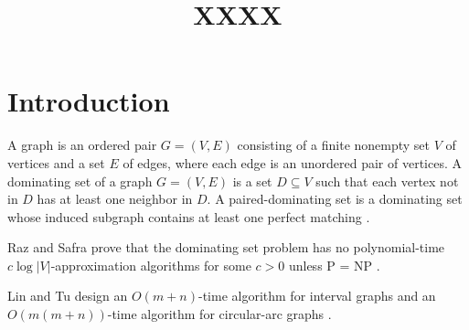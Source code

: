 \documentclass[12pt]{article}
\title{\textbf{XXXX}}
\date{}
\begin{document}
\maketitle

\section{Introduction}
A graph is an ordered pair $G=(V,E)$ consisting of a finite nonempty set $V$ of vertices and a set $E$ of edges, where each edge is an unordered pair of vertices. A dominating set of a graph $G=(V,E)$ is a set $D \subseteq V$ such that each vertex not in $D$ has at least one neighbor in $D$. A paired-dominating set is a dominating set whose induced subgraph contains at least one perfect matching \cite{lamport1}.


Raz and Safra prove that the dominating set problem has no polynomial-time $c \log|V|$-approximation algorithms for some $c > 0$ unless P = NP \cite{lamport2}.

Lin and Tu design an $O(m+n)$-time algorithm for interval graphs and an $O(m(m+n))$-time algorithm for circular-arc graphs \cite {lamport3}.




\end{document}
